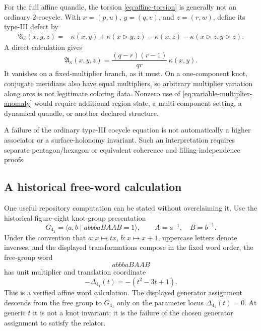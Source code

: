 For the full affine quandle, the torsion
\eqref{eq:affine-torsion} is generally not an ordinary $2$-cocycle.  With
$x=(p,u)$, $y=(q,v)$, and $z=(r,w)$, define its type-III defect by
\begin{align*}
 \mathfrak A_\kappa(x,y,z)
 ={}&\kappa(x,y)+\kappa(x\triangleright y,z)
 -\kappa(x,z)-\kappa(x\triangleright z,y\triangleright z).
\end{align*}
A direct calculation gives
\begin{equation}
 \mathfrak A_\kappa(x,y,z)
 =\frac{(q-r)(r-1)}{qr}\,\kappa(x,y).
 \label{eq:variable-multiplier-anomaly}
\end{equation}
It vanishes on a fixed-multiplier branch, as it must.  On a one-component knot,
conjugate meridians also have equal multipliers, so arbitrary multiplier variation
along arcs is not legitimate coloring data.  Nonzero use of
\eqref{eq:variable-multiplier-anomaly} would require additional region state, a
multi-component setting, a dynamical quandle, or another declared structure.

\begin{warning}
A failure of the ordinary type-III cocycle equation is not automatically a higher
associator or a surface-holonomy invariant.  Such an interpretation requires
separate pentagon/hexagon or equivalent coherence and filling-independence proofs.
\end{warning}

\subsection{A historical free-word calculation}

One useful repository computation can be stated without overclaiming it.  Use the
historical figure-eight knot-group presentation
\[
 G_{4_1}=\langle a,b\mid abbbaBAAB=1\rangle,
 \qquad A=a^{-1},\quad B=b^{-1}.
\]
Under
the convention that $a:x\mapsto tx$, $b:x\mapsto x+1$, uppercase letters denote
inverses, and the displayed transformations compose in the fixed word order, the
free-group word
\[
 abbbaBAAB
\]
has unit multiplier and translation coordinate
\begin{equation}
 -\Delta_{4_1}(t)=-(t^2-3t+1).
 \label{eq:figure-eight-free-word}
\end{equation}
This is a verified affine word calculation.  The displayed generator assignment
descends from the free group to $G_{4_1}$ only on the parameter locus
$\Delta_{4_1}(t)=0$.  At generic $t$ it is not a knot invariant; it is the failure
of the chosen generator assignment to satisfy the relator.

